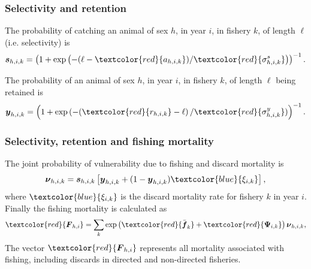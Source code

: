 \documentclass{beamer}
\begin{document}

\begin{frame}
\frametitle{Selectivity and retention}
The probability of catching an animal of sex $h$, in year $i$, in fishery $k$,
of length $\ell$ (i.e. selectivity) is
\begin{equation*}
  \boldsymbol{s}_{h,i,k} = \left(1 + \exp \left(-(\ell - \textcolor{red}{a_{h,i,k}}) /
  \textcolor{red}{\sigma_{h,i,k}^s} \right) \right)^{-1}.
\end{equation*}

The probability of an animal of sex $h$, in year $i$, in fishery $k$, of length
$\ell$ being retained is
\begin{equation*}
  \boldsymbol{y}_{h,i,k} = \left(1 + \exp \left(-(\textcolor{red}{r_{h,i,k}} - \ell \right) /
  \textcolor{red}{\sigma_{h,i,k}^y}) \right)^{-1}.
\end{equation*}
\end{frame}


\begin{frame}
\frametitle{Selectivity, retention and fishing mortality}
The joint probability of vulnerability due to fishing and discard mortality
is
\begin{equation*}
  \boldsymbol\nu_{h,i,k} = \boldsymbol{s}_{h,i,k} \left[ \boldsymbol{y}_{h,i,k} + (1 - \boldsymbol{y}_{h,i,k})
    \textcolor{blue}{\xi_{i,k}} \right],
\end{equation*}
where $\textcolor{blue}{\xi_{i,k}}$ is the discard mortality rate for fishery $k$ in
year $i$. Finally the fishing mortality is calculated as
\begin{align*}
  \textcolor{red}{\boldsymbol{F}_{h,i}} &= \sum_k \exp \left(
    \textcolor{red}{\bar{\boldsymbol{f}}_k} +
    \textcolor{red}{\boldsymbol\Psi_{i,k}} \right) \boldsymbol\nu_{h,i,k},\\
\end{align*}
The vector $\textcolor{red}{\boldsymbol{F}_{h,i}}$ represents all mortality
associated with fishing, including discards in directed and non-directed
fisheries.
\end{frame}

\end{document}
